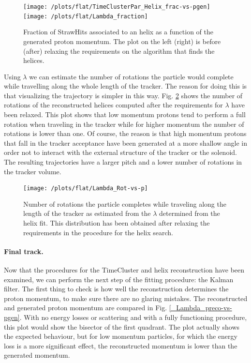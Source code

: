 \documentclass[12pt,a4paper,openright, oneside, titlepage]{book} %
\begin{document}
\begin{figure}[h!]
\centering
\texttt{[image: /plots/flat/TimeClusterPar\_Helix\_frac-vs-pgen]}\hfill
\texttt{[image: /plots/flat/Lambda\_fraction]}
\caption[Fraction of StrawHits in a helix as a function of generated momentum]{Fraction of StrawHits associated to an helix as a function of the generated proton momentum. 
The plot on the left (right) is before (after) relaxing 
the requirements on the algorithm that finds the helices.}
\label{_active_SH_fraction}
\end{figure}

\noindent Using $\lambda$ we can estimate the number of rotations the particle 
would complete while travelling along the whole length of the tracker. 
The reason for doing this is that visualizing the trajectory is simpler in this way. 
Fig. \ref{_Lambda_Rot-vs-p} shows
the number of rotations of the reconstructed helices computed 
after the requirements for $\lambda$ have been relaxed.
This plot shows that low momentum protons tend to perform a full rotation when traveling in the tracker 
while for higher momentum the number of rotations is lower than one. 
Of course, the reason is that high momentum protons that fall in the tracker acceptance have been generated 
at a more shallow angle in order not to interact 
with the external structure of the tracker or the solenoid. 
The resulting trajectories have a larger pitch and a lower number of rotations in the tracker volume.\\


\begin{figure}[h!]
\centering
\texttt{[image: /plots/flat/Lambda\_Rot-vs-p]}
\caption[Number or full rotation in the tracker per generated momentum]
{Number of rotations the particle completes while traveling along the length of the tracker 
as estimated from the $\lambda$ determined from the helix fit. 
This distribution has been obtained after relaxing the requirements in the procedure for the helix search.}
\label{_Lambda_Rot-vs-p}
\end{figure}

\paragraph{Final track.}
Now that the procedures for the TimeCluster and helix reconstruction have been examined, 
we can perform the next step of the fitting procedure: the Kalman filter. 
The first thing to check is how well the reconstruction determines the proton momentum, 
to make sure there are no glaring mistakes. 
The reconstructed and generated proton momentum 
are compared in Fig. \ref{_Lambda_preco-vs-pgen}. 
With no energy losses or scattering and with a fully functioning procedure, 
this plot would show the bisector of the first quadrant. 
The plot actually shows the expected behaviour, 
but for low momentum particles, 
for which the energy loss is a more significant effect, 
the reconstructed momentum is lower than the generated momentum. 
\end{document}
